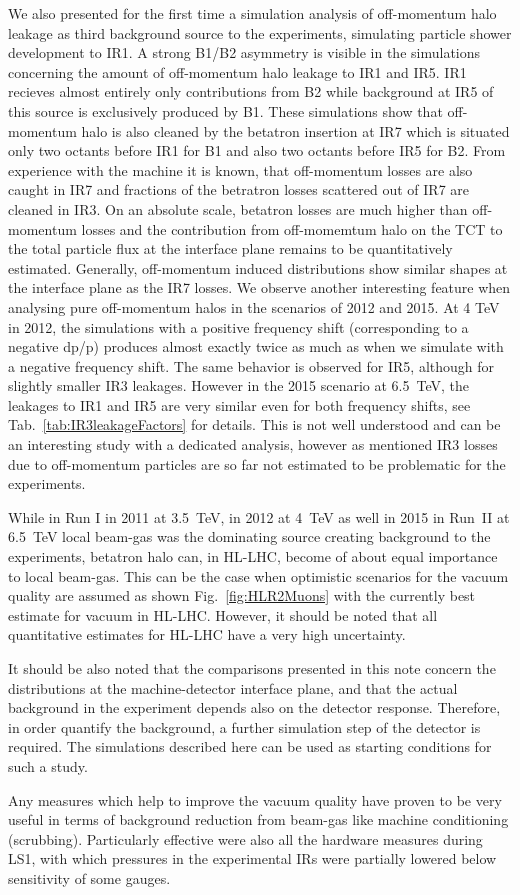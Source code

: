 We also presented for the first time a simulation analysis of off-momentum halo leakage as third background source to the experiments, simulating particle shower development to IR1. A strong B1/B2 asymmetry is visible in the simulations concerning the amount of off-momentum halo leakage to IR1 and IR5. IR1 recieves almost entirely only contributions from B2 while background at IR5 of this source is exclusively produced by B1. These simulations show that off-momentum halo is also cleaned by the betatron insertion at IR7 which is situated only two octants before IR1 for B1 and also two octants before IR5 for B2. From experience with the machine it is known, that off-momentum losses are also caught in IR7 and fractions of the betratron losses scattered out of IR7 are cleaned in IR3. On an absolute scale, betatron losses are much higher than off-momentum losses and the contribution from off-momemtum halo on the TCT to the total particle flux at the interface plane remains to be quantitatively estimated.
Generally, off-momentum induced distributions show similar shapes at the interface plane as the IR7 losses. We observe another interesting feature when analysing pure off-momentum halos in the scenarios of 2012 and 2015. At 4 TeV in 2012, the simulations with a positive frequency shift (corresponding to a negative dp/p) produces almost exactly twice as much as when we simulate with a negative frequency shift. The same behavior is observed for IR5, although for slightly smaller IR3 leakages. However in the 2015 scenario at 6.5~TeV, the leakages to IR1 and IR5 are very similar even for both frequency shifts, see Tab.~\ref{tab:IR3leakageFactors} for details. This is not well understood and can be an interesting study with a dedicated analysis, however as mentioned IR3 losses due to off-momentum particles are so far not estimated to be problematic for the experiments. 


While in Run I in 2011 at 3.5~TeV, in 2012 at 4~TeV as well in 2015 in Run~II at 6.5~TeV local beam-gas was the dominating source creating background to the experiments, betatron halo can, in HL-LHC, become of about equal importance to local beam-gas. This can be the case when optimistic scenarios for the vacuum quality are assumed as shown Fig.~\ref{fig:HLR2Muons} with the currently best estimate for vacuum in HL-LHC. However, it should be noted that all quantitative estimates for HL-LHC have a very high uncertainty.

It should be also noted that the comparisons presented in this note concern the distributions at the machine-detector interface plane, and that the actual background in the experiment depends also on the detector response. Therefore, in order quantify the background, a further simulation step of the detector is required. The simulations described here can be used as starting conditions for such a study.

Any measures which help to improve the vacuum quality have proven to be very useful in terms of background reduction from beam-gas like machine conditioning (scrubbing). Particularly effective were also all the hardware measures during LS1, with which pressures in the experimental IRs were partially lowered below sensitivity of some gauges.


